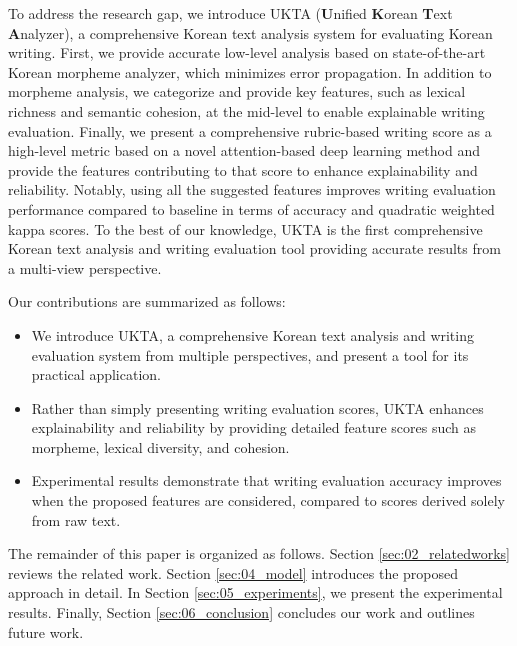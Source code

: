 To address the research gap, we introduce \textsf{UKTA} (\textbf{U}nified \textbf{K}orean \textbf{T}ext \textbf{A}nalyzer), a comprehensive Korean text analysis system for evaluating Korean writing. 
First, we provide accurate low-level analysis based on 
state-of-the-art Korean morpheme
analyzer, which minimizes error propagation. 
In addition to morpheme analysis, we categorize and provide key features, such as lexical richness and semantic cohesion, at the mid-level to enable explainable writing evaluation.
Finally, we present a comprehensive rubric-based writing score as a high-level metric based on a novel attention-based deep learning method and provide the features contributing to that score to enhance explainability and reliability. 
Notably, using all the suggested features improves writing evaluation performance compared to baseline in terms of accuracy and quadratic weighted kappa scores.
To the best of our knowledge, \textsf{UKTA} is the first comprehensive Korean text analysis and writing evaluation tool providing accurate results from a multi-view perspective.

Our contributions are summarized as follows:

\begin{itemize}[leftmargin=1.1em]
\item We introduce \textsf{UKTA}, a comprehensive Korean text analysis and writing evaluation system from multiple perspectives, and present a tool for its practical application.

\item Rather than simply presenting writing evaluation scores, \textsf{UKTA} enhances explainability and reliability by providing detailed feature scores such as morpheme, lexical diversity, and cohesion.

\item Experimental results demonstrate that writing evaluation accuracy improves when the proposed features are considered, compared to scores derived solely from raw text.
\end{itemize} 

The remainder of this paper is organized as follows.
Section \ref{sec:02_relatedworks} reviews the related work.
Section \ref{sec:04_model} introduces the proposed approach in detail.
In Section \ref{sec:05_experiments}, we present the experimental results. Finally, Section \ref{sec:06_conclusion} concludes our work and outlines future work.

